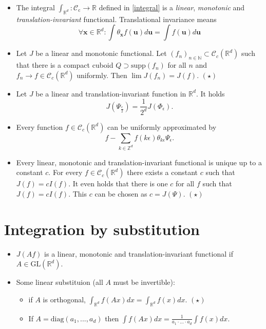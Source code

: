 \documentclass[a4paper, 11pt]{article}
\theoremstyle{plain}
\theoremstyle{definition}
\begin{document}
\begin{itemize}
	\item The integral $\int_{\mathbb R^d}: \mathcal C_{\mathrm c} \to \mathbb R$ defined in \eqref{integral} is a \emph{linear}, \emph{monotonic} and \emph{translation-invariant} functional. Translational invariance means
	\[
		\forall \mathbf x \in \mathbb R^d: \int \theta_{\mathbf x} f(\mathbf u) d\mathbf u = \int f(\mathbf u) d\mathbf u
	\]
	
	\item Let $J$ be a linear and monotonic functional. Let $(f_n)_{n \in \mathbb N} \subset \mathcal C_c(\mathbb R^d)$ such that there is a compact cuboid $Q \supset \mathrm{supp}(f_n)$ for all $n$ and $f_n \to f \in \mathcal C_c(\mathbb R^d)$ uniformly. Then $\lim J(f_n) = J(f)$. $(\star)$ 
	
	\item Let $J$ be a linear and translation-invariant function in $\mathbb R^d$. It holds
	\[
		J(\Psi_{\frac{\epsilon}{2}}) = \frac{1}{2^d}J(\Phi_{\epsilon}).
	\]
	
	\item Every function $f \in \mathcal C_c(\mathbb R^d)$ can be uniformly approximated by
	\[
		f - \sum_{k \in \mathbb Z^d} f(k\epsilon)\theta_{k\epsilon}\Psi_{\epsilon}.
	\]
	
	\item Every linear, monotonic and translation-invariant functional is unique up to a constant $c$. For every $f \in \mathcal C_c(\mathbb R^d)$ there exists a constant $c$ such that $J(f) = cI(f)$. It even holds that there is one $c$ for all $f$ such that $J(f) = cI(f)$. This $c$ can be chosen as $c = J(\Psi)$. $(\star)$
\end{itemize}

\section{Integration by substitution} 
\begin{itemize}
	\item $J(Af)$ is a linear, monotonic and translation-invariant functional if $A \in \mathrm{GL}(\mathbb R^d)$.
	
	\item Some linear substituion (all $A$ must be invertible): 
	\begin{itemize}
		\item  if $A$ is orthogonal, $\int_{\mathbb R^d} f(Ax) dx = \int_{\mathbb R^d} f(x)dx$. $(\star)$
		\item If $A = \mathrm{diag}(a_1,...,a_d)$ then $\int f(Ax) dx = \frac{1}{a_1 \cdot ... \cdot a_d}\int f(x)dx$. 
	\end{itemize}
\end{itemize}
\end{document}
